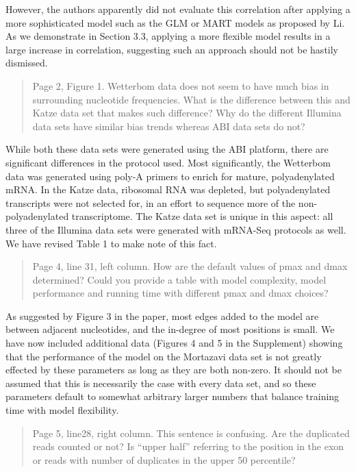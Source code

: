 \documentclass{article}
\begin{document}
However, the authors apparently did not evaluate this correlation after applying
a more sophisticated model such as the GLM or MART models as proposed by Li. As
we demonstrate in Section 3.3, applying a more flexible model results in a large
increase in correlation, suggesting such an approach should not be hastily
dismissed.


\begin{quote}
Page 2, Figure 1. Wetterbom data does not seem to have much bias in surrounding
nucleotide frequencies. What is the difference between this and Katze data set
that makes such difference? Why do the different Illumina data sets have similar
bias trends whereas ABI data sets do not?
\end{quote}

While both these data sets were generated using the ABI platform, there are
significant differences in the protocol used. Most significantly, the Wetterbom
data was generated using poly-A primers to enrich for mature, polyadenylated
mRNA. In the Katze data, ribosomal RNA was depleted, but polyadenylated
transcripts were not selected for, in an effort to sequence more of the
non-polyadenylated transcriptome. The Katze data set is unique in this aspect:
all three of the Illumina data sets were generated with mRNA-Seq protocols as
well.  We have revised Table 1 to make note of this fact.


\begin{quote}
Page 4, line 31, left column. How are the default values of pmax and dmax
determined? Could you provide a table with model complexity, model performance
and running time with different pmax and dmax choices?
\end{quote}

As suggested by Figure 3 in the paper, most edges added to the model are between
adjacent nucleotides, and the in-degree of most positions is small.  We have now
included additional data (Figures 4 and 5 in the Supplement) showing that the
performance of the model on the Mortazavi data set is not greatly effected by
these parameters as long as they are both non-zero. It should not be assumed
that this is necessarily the case with every data set, and so these parameters
default to somewhat arbitrary larger numbers that balance training time with
model flexibility.


\begin{quote}
Page 5, line28, right column. This sentence is confusing. Are the duplicated
reads counted or not? Is ``upper half'' referring to the position in the exon or
reads with number of duplicates in the upper 50 percentile?
\end{quote}
\end{document}
